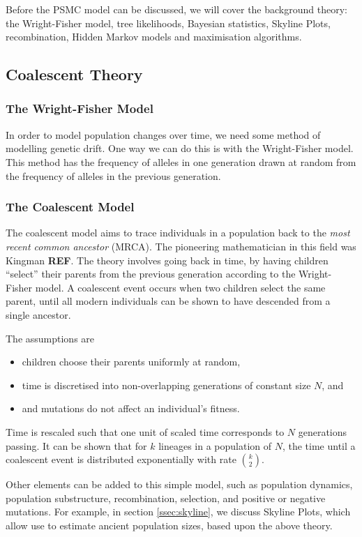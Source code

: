 \documentclass[12pt]{article}
\begin{document}
Before the PSMC model can be discussed, we will cover the background theory: the Wright-Fisher model, tree likelihoods, Bayesian statistics, Skyline Plots, recombination, Hidden Markov models and maximisation algorithms.

\subsection{Coalescent Theory}\label{ssec:CoalTh}
\subsubsection{The Wright-Fisher Model}\label{sssec:WFMo}
In order to model population changes over time, we need some method of modelling genetic drift. One way we can do this is with the Wright-Fisher model. This method has the frequency of alleles in one generation drawn at random from the frequency of alleles in the previous generation.

\subsubsection{The Coalescent Model}\label{sssec:CoalMo}
The coalescent model aims to trace individuals in a population back to the \emph{most recent common ancestor} (MRCA). The pioneering mathematician in this field was Kingman \textbf{REF}. The theory involves going back in time, by having children ``select'' their parents from the previous generation according to the Wright-Fisher model. A coalescent event occurs when two children select the same parent, until all modern individuals can be shown to have descended from a single ancestor.

The assumptions are
\begin{itemize}
\item children choose their parents uniformly at random,
\item time is discretised into non-overlapping generations of constant size $N$, and
  \item and mutations do not affect an individual's fitness.
\end{itemize}
Time is rescaled such that one unit of scaled time corresponds to $N$ generations passing. It can be shown that for $k$ lineages in a population of $N$, the time until a coalescent event is distributed exponentially with rate ${k\choose 2}$.

Other elements can be added to this simple model, such as population dynamics, population substructure, recombination, selection, and positive or negative mutations. For example, in section \ref{ssec:skyline}, we discuss Skyline Plots, which allow use to estimate ancient population sizes, based upon the above theory.
\end{document}
